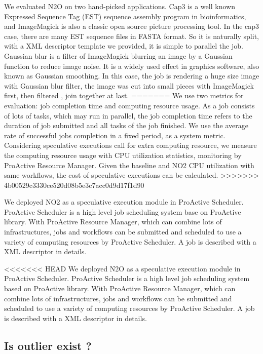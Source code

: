 We evaluated N2O on two hand-picked applications. Cap3 is a well known Expressed Sequence Tag (EST) sequence assembly program in bioinformatics, and ImageMagick is also a classic open source picture processing tool. In the cap3 case, there are many EST sequence files in FASTA format. So it is naturally split, with a XML descriptor template we provided, it is simple to parallel the job. Gaussian blur is a filter of ImageMagick blurring an image by a Gaussian function to reduce image noise. It is a widely used effect in graphics software, also known as Gaussian smoothing. In this case, the job is rendering a huge size image with Gaussian blur filter, the image was cut into small pieces with ImageMagick first, then filtered , join together at last.
=======
We use two metrics for evaluation: job completion time and computing resource usage. As a job consists of lots of tasks, which may run in parallel, the job completion time refers to the duration of job submitted and all tasks of the job finished. We use the average rate of successful jobs completion in a fixed period, as a system metric. Considering speculative executions call for extra computing resource, we measure the computing resource usage with CPU utilization statistics, monitoring by ProActive Resource Manager. Given the baseline and NO2 CPU utilization with same workflows, the cost of speculative executions can be calculated.
>>>>>>> 4b00529c3330ce520d08b5e3c7acc0d9d17f1d90

 We deployed NO2 as a speculative execution module in ProActive Scheduler. ProActive Scheduler is a high level job scheduling system base on ProActive library. With ProActive Resource Manager, which can combine lots of infrastructures, jobs and workflows can be submitted and scheduled to use a variety of computing resources by ProActive Scheduler. A job is described with a XML descriptor in details.

<<<<<<< HEAD
 We deployed N2O as a speculative execution module in ProActive Scheduler. ProActive Scheduler is a high level job scheduling system based on ProActive library. With ProActive Resource Manager, which can combine lots of infrastructures, jobs and workflows can be submitted and scheduled to use a variety of computing resources by ProActive Scheduler. A job is described with a XML descriptor in details.

\subsection{Is outlier exist ?}


